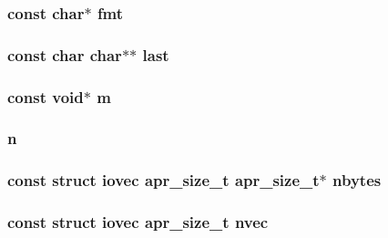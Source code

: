 \subsubsection[{\texorpdfstring{fmt}{fmt}}]{\setlength{\rightskip}{0pt plus 5cm}const char$\ast$ fmt}\hypertarget{group__apr__strings_ga381d684d94e6e91dee650357e8f02fa8}{}\label{group__apr__strings_ga381d684d94e6e91dee650357e8f02fa8}
\subsubsection[{\texorpdfstring{last}{last}}]{\setlength{\rightskip}{0pt plus 5cm}const char char$\ast$$\ast$ last}\hypertarget{group__apr__strings_ga882d08c2e3ad3004cdfc219601ebaac8}{}\label{group__apr__strings_ga882d08c2e3ad3004cdfc219601ebaac8}
\subsubsection[{\texorpdfstring{m}{m}}]{\setlength{\rightskip}{0pt plus 5cm}const {\bf void}$\ast$ m}\hypertarget{group__apr__strings_gacb57d1edb8c39faf512f51b83b431cc4}{}\label{group__apr__strings_gacb57d1edb8c39faf512f51b83b431cc4}
\subsubsection[{\texorpdfstring{n}{n}}]{ n}\hypertarget{group__apr__strings_ga29292afc9d0df52b211c0309dd65f20e}{}\label{group__apr__strings_ga29292afc9d0df52b211c0309dd65f20e}
\subsubsection[{\texorpdfstring{nbytes}{nbytes}}]{\setlength{\rightskip}{0pt plus 5cm}const struct iovec {\bf apr\+\_\+size\+\_\+t} {\bf apr\+\_\+size\+\_\+t}$\ast$ nbytes}\hypertarget{group__apr__strings_gaf0c13da0f13a4ee51a11fd8ab1a5213c}{}\label{group__apr__strings_gaf0c13da0f13a4ee51a11fd8ab1a5213c}
\subsubsection[{\texorpdfstring{nvec}{nvec}}]{\setlength{\rightskip}{0pt plus 5cm}const struct iovec {\bf apr\+\_\+size\+\_\+t} nvec}\hypertarget{group__apr__strings_gacb23e6e628f47db01b56c8cbc43a45f1}{}\label{group__apr__strings_gacb23e6e628f47db01b56c8cbc43a45f1}

